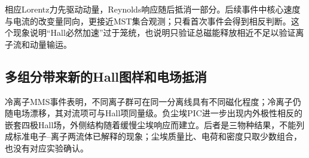 相应Lorentz力先驱动动量，Reynolds响应随后抵消一部分。后续事件中核心速度与电流的改变量同向，更接近MST集合观测；只看首次事件会得到相反判断。这个现象说明“Hall必然加速”过于笼统，也说明只验证总磁能释放相近不足以验证离子流和动量输运。

\subsection{多组分带来新的Hall图样和电场抵消}
冷离子MMS事件\citep{L227}表明，不同离子群可在同一分离线具有不同磁化程度；冷离子仍随电场漂移，其对流项可与Hall项同量级。负尘埃PIC\citep{L283}进一步出现内外极性相反的嵌套四极Hall场，外侧结构随着缓慢尘埃响应而建立。后者是三物种结果，不能列成标准电子--离子两流体已解释的现象；尘埃质量比、电荷和密度只取少数组合，也没有对应实验确认。
